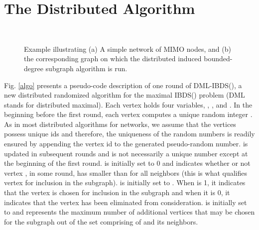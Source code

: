 \documentclass[journal,12pt,onecolumn]{IEEEtran}
\begin{document}
\section{The Distributed Algorithm}
\label{sec:algo}

\begin{figure}[!t]
\begin{center}
    \\
    \caption{Example illustrating (a) A simple network of MIMO nodes,
      and (b) the corresponding graph on which the distributed induced
      bounded-degree subgraph algorithm is run.}
\end{center}
\end{figure}

Fig.\,\,\ref{algo} presents a pseudo-code description of one round of
DML-IBDS(), a new distributed randomized algorithm for the
maximal IBDS() problem (DML stands for distributed maximal). Each vertex  holds four variables,
, ,  and . In the beginning before the
first round, each vertex  computes a unique random 
integer . As in most distributed algorithms for networks, we
assume that the vertices possess unique ids and therefore, the
uniqueness of the random numbers is readily ensured by appending the
vertex id to the generated pseudo-random number.  is updated in
subsequent rounds and is not necessarily a unique number except at the
beginning of the first round.  is initially set to 0 and  
indicates whether or not vertex , in some round, has  smaller
than  for all neighbors  (this is what qualifies vertex 
for inclusion in the subgraph).  is initially set to
. When  is 1, it indicates that the vertex is chosen for
inclusion in the subgraph and when it is 0, it indicates that the
vertex has been eliminated from consideration.  is initially set
to  and represents the maximum number of additional vertices that may be chosen for the
subgraph out of the set comprising of  and its neighbors.
\end{document}
